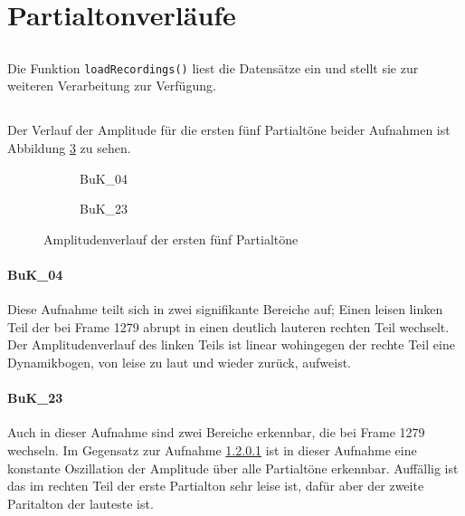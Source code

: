 \section{Partialtonverläufe}
\label{sec:1}

\subsection{}
Die Funktion \texttt{loadRecordings()} liest die Datensätze ein und stellt sie zur weiteren Verarbeitung zur Verfügung.

\subsection{}
Der Verlauf der Amplitude für die ersten fünf Partialtöne beider Aufnahmen ist Abbildung \ref{fig:ampl} zu sehen.

\begin{figure}[tbh]
    \centering
    \begin{subfigure}{.5\textwidth}
        \centering
        \caption{BuK\_04}
        \scalebox{0.5}{}
        \label{fig:sub1}
    \end{subfigure}%
    \begin{subfigure}{.5\textwidth}
        \centering
        \caption{BuK\_23}
        \scalebox{0.5}{}
        \label{fig:sub2}
    \end{subfigure}
    \caption{Amplitudenverlauf der ersten fünf Partialtöne}
    \label{fig:ampl}
\end{figure}

\paragraph{BuK\_04}
\label{par:04_amp}
Diese Aufnahme teilt sich in zwei signifikante Bereiche auf;
Einen leisen linken Teil der bei Frame 1279 abrupt in einen deutlich lauteren rechten Teil wechselt.
Der Amplitudenverlauf des linken Teils ist linear wohingegen der rechte Teil eine Dynamikbogen, von leise zu laut und wieder zurück, aufweist.

\paragraph{BuK\_23}
Auch in dieser Aufnahme sind zwei Bereiche erkennbar, die bei Frame 1279 wechseln.
Im Gegensatz zur Aufnahme \ref{par:04_amp} ist in dieser Aufnahme eine konstante Oszillation der Amplitude über alle Partialtöne erkennbar.
Auffällig ist das im rechten Teil der erste Partialton sehr leise ist, dafür aber der zweite Paritalton der lauteste ist.


